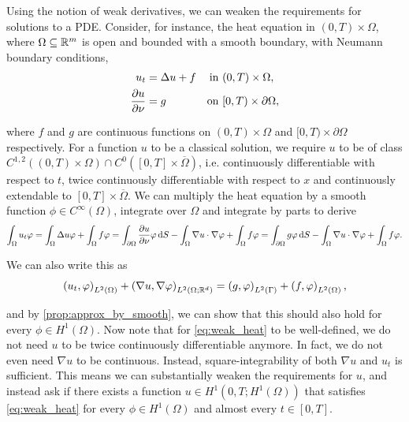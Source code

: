 Using the notion of weak derivatives, we can weaken the requirements for solutions to a PDE. Consider, for instance, the heat equation in $(0, T) \times \Omega$, where $\Omega \subseteq \R^m$ is open and bounded with a smooth boundary, with Neumann boundary conditions,
%
\begin{equation}
\label{eq:strong_heat}
\begin{aligned}
    u_t &= \Delta u + f     & \text{in } &(0, T) \times \Omega,\\
    \pderiv[u]{\nu} &= g    & \text{on } &[0, T) \times \partial \Omega,
\end{aligned}
\end{equation}

\noindent
where $f$ and $g$ are continuous functions on $(0, T) \times \Omega$ and $[0, T) \times \partial \Omega$ respectively. For a function $u$ to be a classical solution, we require $u$ to be of class $C^{1,2}((0, T) \times \Omega) \cap C^{0}([0, T] \times \overline{\Omega})$, i.e. continuously differentiable with respect to $t$, twice continuously differentiable with respect to $x$ and continuously extendable to $[0, T] \times \overline{\Omega}$. We can multiply the heat equation by a smooth function $\phi \in C^{\infty}(\Omega)$, integrate over $\Omega$ and integrate by parts to derive
%
\begin{equation*}
    \int_{\Omega} u_{t} \phi = \int_{\Omega} \Delta u \phi + \int_\Omega f \phi = \int_{\partial \Omega} \pderiv[u]{\nu} \phi \d S - \int_{\Omega} \nabla u \cdot \nabla \phi + \int_\Omega f \phi = \int_{\partial \Omega} g \phi \d S - \int_{\Omega} \nabla u \cdot \nabla \phi + \int_\Omega f \phi .
\end{equation*}

\noindent
We can also write this as 
%
\begin{equation}\label{eq:weak_heat}
    \inner{u_t, \phi}_{\Ltwo{\Omega}} + \inner{\nabla u, \nabla \phi}_{\Ltwo{\Omega; \R^d}} = \inner{g, \phi}_{\Ltwo{\Gamma}} + \inner{f, \phi}_{\Ltwo{\Omega}} ,
\end{equation}

\noindent
and by \cref{prop:approx_by_smooth}, we can show that this should also hold for every $\phi \in H^1(\Omega)$. Now note that for \cref{eq:weak_heat} to be well-defined, we do not need $u$ to be twice continuously differentiable anymore. In fact, we do not even need $\nabla u$ to be continuous. Instead, square-integrability of both $\nabla u$ and $u_t$ is sufficient. This means we can substantially weaken the requirements for $u$, and instead ask if there exists a function $u \in H^1(0, T; H^1(\Omega))$ that satisfies \cref{eq:weak_heat} for every $\phi \in H^1(\Omega)$ and almost every $t \in [0, T]$.